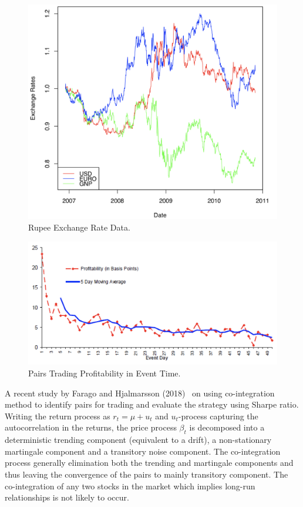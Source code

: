 	\begin{figure}[!ht]
	\centering
	\includegraphics[width=\textwidth]{chapters/chapter_stat_ts/figures/473.png}
	\caption{Rupee Exchange Rate Data. \label{fig:rupee}}
	\end{figure}

	\begin{figure}[!ht]
	\centering
	\includegraphics[width=\textwidth]{chapters/chapter_stat_ts/figures/Sec4-7Fig4.png}
	\caption{Pairs Trading Profitability in Event Time. \label{fig:pairsprofit}}
	\end{figure}

A recent study by Farago and Hjalmarsson (2018)~\cite{faragohjalm} on using co-integration method to identify pairs for trading and evaluate the strategy using Sharpe ratio. Writing the return process as $r_t= \mu + u_t$ and $u_t$-process capturing the autocorrelation in the returns, the price process $\beta_t$ is decomposed into a deterministic trending component (equivalent to a drift), a non-stationary martingale component and a transitory noise component. The co-integration process generally elimination both the trending and martingale components and thus leaving the convergence of the pairs to mainly transitory component. The co-integration of any two stocks in the market which implies long-run relationships is not likely to occur.



